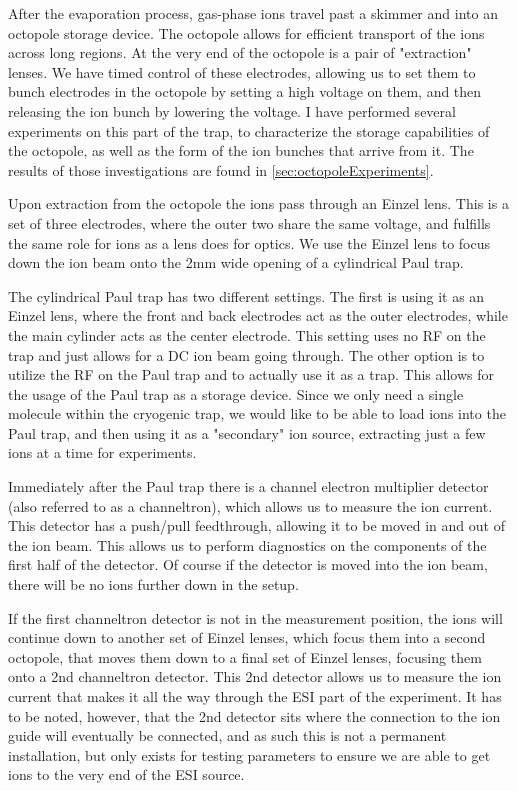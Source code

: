 After the evaporation process, gas-phase ions travel past a skimmer and into an octopole storage device. The octopole allows for efficient transport of the ions across long regions. At the very end of the octopole is a pair of "extraction" lenses. We have timed control of these electrodes, allowing us to set them to bunch electrodes in the octopole by setting a high voltage on them, and then releasing the ion bunch by lowering the voltage. I have performed several experiments on this part of the trap, to characterize the storage capabilities of the octopole, as well as the form of the ion bunches that arrive from it. The results of those investigations are found in \cref{sec:octopoleExperiments}.

Upon extraction from the octopole the ions pass through an Einzel lens. This is a set of three electrodes, where the outer two share the same voltage, and fulfills the same role for ions as a lens does for optics. We use the Einzel lens to focus down the ion beam onto the 2mm wide opening of a cylindrical Paul trap.

The cylindrical Paul trap has two different settings. The first is using it as an Einzel lens, where the front and back electrodes act as the outer electrodes, while the main cylinder acts as the center electrode. This setting uses no RF on the trap and just allows for a DC ion beam going through.
The other option is to utilize the RF on the Paul trap and to actually use it as a trap. This allows for the usage of the Paul trap as a storage device. Since we only need a single molecule within the cryogenic trap, we would like to be able to load ions into the Paul trap, and then using it as a "secondary" ion source, extracting just a few ions at a time for experiments.

Immediately after the Paul trap there is a channel electron multiplier detector (also referred to as a channeltron), which allows us to measure the ion current. This detector has a push/pull feedthrough, allowing it to be moved in and out of the ion beam. This allows us to perform diagnostics on the components of the first half of the detector. Of course if the detector is moved into the ion beam, there will be no ions further down in the setup.

If the first channeltron detector is not in the measurement position, the ions will continue down to another set of Einzel lenses, which focus them into a second octopole, that moves them down to a final set of Einzel lenses, focusing them onto a 2nd channeltron detector. This 2nd detector allows us to measure the ion current that makes it all the way through the ESI part of the experiment.
It has to be noted, however, that the 2nd detector sits where the connection to the ion guide will eventually be connected, and as such this is not a permanent installation, but only exists for testing parameters to ensure we are able to get ions to the very end of the ESI source.
